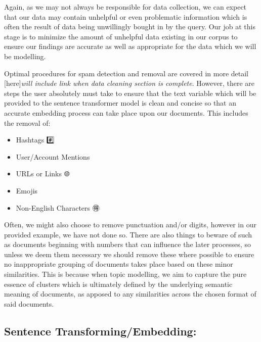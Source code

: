 \documentclass[
  letterpaper,
  DIV=11,
  numbers=noendperiod]{scrreprt}
\providecommand{\tightlist}{%
  \setlength{\itemsep}{0pt}\setlength{\parskip}{0pt}}\usepackage{longtable,booktabs,array}
\begin{document}
Again, as we may not always be responsible for data collection, we can
expect that our data may contain unhelpful or even problematic
information which is often the result of data being unwillingly bought
in by the query. Our job at this stage is to minimize the amount of
unhelpful data existing in our corpus to ensure our findings are
accurate as well as appropriate for the data which we will be modelling.

Optimal procedures for spam detection and removal are covered in more
detail {[}here{]}\emph{will include link when data cleaning section is
complete}. However, there are steps the user absolutely must take to
ensure that the text variable which will be provided to the sentence
transformer model is clean and concise so that an accurate embedding
process can take place upon our documents. This includes the removal of:

\begin{itemize}
\tightlist
\item
  Hashtags \#️⃣
\item
  User/Account Mentions 💬
\item
  URLs or Links 🌐
\item
  Emojis 🐙
\item
  Non-English Characters 🉐
\end{itemize}

Often, we might also choose to remove punctuation and/or digits, however
in our provided example, we have not done so. There are also things to
beware of such as documents beginning with numbers that can influence
the later processes, so unless we deem them necessary we should remove
these where possible to ensure no inappropriate grouping of documents
takes place based on these minor similarities. This is because when
topic modelling, we aim to capture the pure essence of clusters which is
ultimately defined by the underlying semantic meaning of documents, as
apposed to any similarities across the chosen format of said documents.

\subsection{Sentence
Transforming/Embedding:}\label{sentence-transformingembedding}
\end{document}
